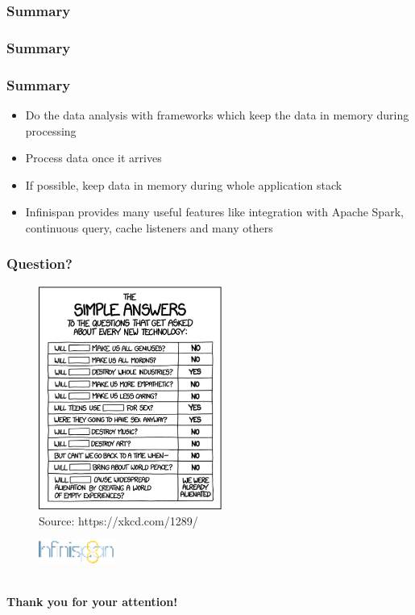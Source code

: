 \documentclass[10pt,utf8]{beamer}
\begin{document}
\begin{frame}
	\frametitle{Summary}
	\vspace{3cm}
	\vspace{3cm}
\end{frame}

\begin{frame}
	\frametitle{Summary}
	\vspace{3cm}
	\vspace{3cm}
\end{frame}


\begin{frame}
	\frametitle{Summary}
	\begin{itemize}
		\item Do the data analysis with frameworks which keep the data in memory during processing
		\item Process data once it arrives
		\item If possible, keep data in memory during whole application stack
		\item Infinispan provides many useful features like integration with Apache Spark, continuous query, cache listeners and many others
	\end{itemize}
\end{frame}


\begin{frame}
	\frametitle{Question?}
	\begin{figure}
		\centering
		\includegraphics[width=6cm]{./img/simple_answers.eps}
		\caption{\tiny{Source: https://xkcd.com/1289/}}
	\end{figure}
\end{frame}

\begin{frame}
	\begin{figure}
		\centering
		\includegraphics[width=2.5cm]{./img/infinispan8.eps}
	\end{figure}
	\centering
	\large{} \\
	\vspace{1cm}
	\huge{\textbf{Thank you for your attention!}} \\
\end{frame}
\end{document}
